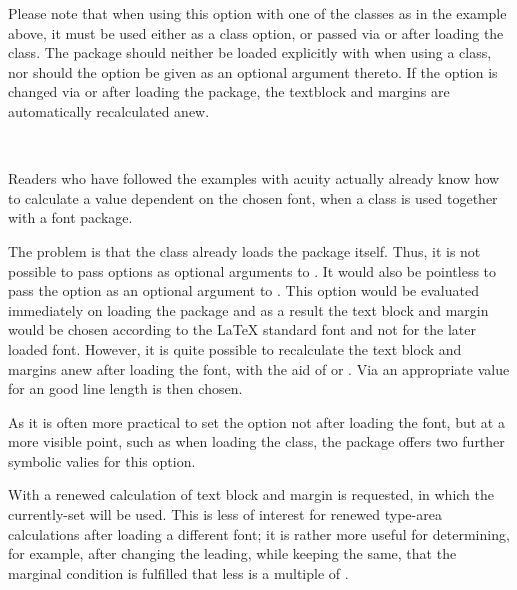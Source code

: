 Please note that when using this option with one of the {\KOMAScript}
classes as in the example above, it must be used either as a class
option, or passed via  or  after
loading the class. The  package should neither be
loaded explicitly with  when using a {\KOMAScript}
class, nor should the option be given as an optional argument
thereto. If the option is changed via  or
 after loading the package, the textblock and
margins are automatically recalculated anew.%
%
%
%

%
%
\begin{Declaration}
  \\
\end{Declaration}%
Readers who have followed the
examples with acuity actually already know how to calculate a
 value dependent on the chosen font, when a {\KOMAScript}
class is used together with a font package.

\begin{Explain}
  The problem is that the {\KOMAScript} class already loads the
   package itself. Thus, it is not possible to pass
  options as optional arguments to . It would also
  be pointless to pass the  option as an
  optional argument to . This option would be
  evaluated immediately on loading the  package and
  as a result the text block and margin would be chosen according to
  the {\LaTeX} standard font and not for the later loaded
  font. However, it is quite possible to recalculate the text block
  and margins anew after loading the font, with the aid of
   or
  . Via
   an appropriate  value for an good line length
  is then chosen.

  As it is often more practical to set the  option not
  after loading the font, but at a more visible point, such as when
  loading the class, the  package offers two further
  symbolic valies for this option.
\end{Explain}

With 
a renewed calculation of text block and margin is requested, in which
the currently-set  will be used. This is less of interest for
renewed type-area calculations after loading a different font; it is
rather more useful for determining, for example, after changing the
leading, while keeping  the same, that the marginal condition
is fulfilled that  less
 is a multiple of .

